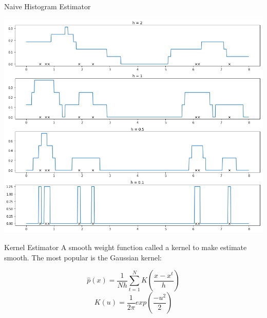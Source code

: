 \documentclass{beamer}
\begin{document}
\begin{frame}[fragile]{Naive Histogram Estimator}
  \begin{center}
    \includegraphics[height=0.9\textheight]{images/naive_estimator.png}
  \end{center}
\end{frame}

\begin{frame}[fragile]{Kernel Estimator}
A smooth weight function called a kernel to make estimate smooth. 
The most popular is the Gaussian kernel:

	\begin{equation}
		\hat p(x)=\frac{1}{Nh}\sum_{t=1}^{N}K\left( \frac{x-x^t}{h}\right)
	\end{equation}
	\begin{equation}
		K(u)=\frac{1}{2\pi}exp\left(\frac{-u^2}{2}\right)
	\end{equation}    

\end{frame}
\end{document}

